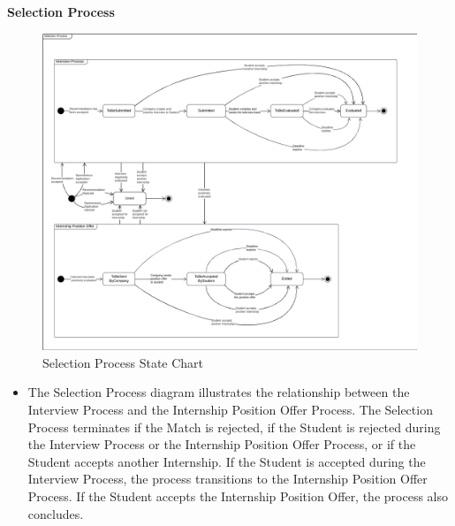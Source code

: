 \noindent\textbf{\color{titleColor}Selection Process}\\
\begin{figure}[H]
    \centering
    \includegraphics[width=1 \textwidth]{Latex/Images/SelectionProcessStateChart.png}
    \caption{Selection Process State Chart}
    \label{fig:SelectionProcess}
\end{figure}
\begin{itemize}
    \item The Selection Process diagram illustrates the relationship between the Interview Process and the Internship Position Offer Process.
    The Selection Process terminates if the Match is rejected, if the Student is rejected during the Interview Process or the Internship Position Offer Process, or if the Student accepts another Internship.
    If the Student is accepted during the Interview Process, the process transitions to the Internship Position Offer Process.
    If the Student accepts the Internship Position Offer, the process also concludes.
\end{itemize}
\clearpage
